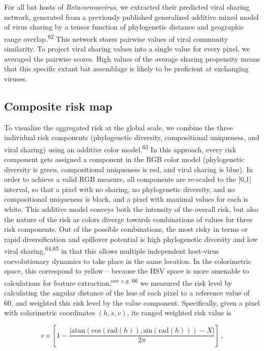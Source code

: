 \documentclass[10pt,oneside]{article}
\begin{document}
For all bat hosts of \emph{Betacoronavirus}, we extracted their
predicted viral sharing network, generated from a previously published
generalized additive mixed model of virus sharing by a tensor function
of phylogenetic distance and geographic range
overlap.\textsuperscript{62} This network stores pairwise values of
viral community similarity. To project viral sharing values into a
single value for every pixel, we averaged the pairwise scores. High
values of the average sharing propensity means that this specific extant
bat assemblage is likely to be proficient at exchanging viruses.

\hypertarget{composite-risk-map}{%
\subsection{Composite risk map}\label{composite-risk-map}}

To visualize the aggregated risk at the global scale, we combine the
three individual risk components (phylogenetic diversity, compositional
uniqueness, and viral sharing) using an additive color
model.\textsuperscript{63} In this approach, every risk component gets
assigned a component in the RGB color model (phylogenetic diversity is
green, compositional uniqueness is red, and viral sharing is blue). In
order to achieve a valid RGB measure, all components are re-scaled to
the {[}0,1{]} interval, so that a pixel with no sharing, no phylogenetic
diversity, and no compositional uniqueness is black, and a pixel with
maximal values for each is white. This additive model conveys both the
intensity of the overall risk, but also the nature of the risk as colors
diverge towards combinations of values for three risk components. Out of
the possible combinations, the most risky in terms or rapid
diversification and spillover potential is high phylogenetic diversity
and low viral sharing,\textsuperscript{64,65} in that this allows
multiple independent host-virus coevolutionary dynamics to take place in
the same location. In the colorimetric space, this correspond to yellow
-- because the HSV space is more amenable to calculations for feature
extraction,\textsuperscript{see \emph{e.g.} 66} we measured the risk
level by calculating the angular distance of the hue of each pixel to a
reference value of 60, and weighted this risk level by the value
component. Specifically, given a pixel with colorimetric coordinates
\((h,s,v)\), its ranged weighted risk value is

\[
v\times\left[1-\frac{\left|\text{atan}\left(\text{cos}(\text{rad}(h)), \text{sin}(\text{rad}(h))\right) - X\right|}{2\pi}\right]\,,
\]
\end{document}
